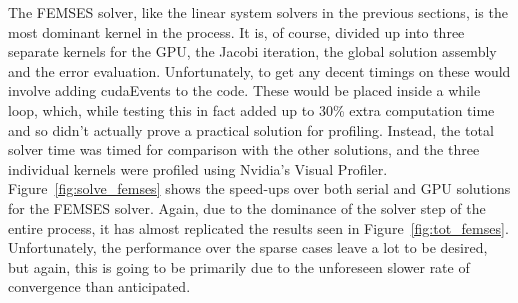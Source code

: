 The FEMSES solver, like the linear system solvers in the previous sections, is the most dominant kernel in the process. It is, of course, divided up into three separate kernels for the GPU, the Jacobi iteration, the global solution assembly and the error evaluation. Unfortunately, to get any decent timings on these would involve adding cudaEvents to the code. These would be placed inside a while loop, which, while testing this in fact added up to 30\% extra computation time and so didn't actually prove a practical solution for profiling. Instead, the total solver time was timed for comparison with the other solutions, and the three individual kernels were profiled using Nvidia's Visual Profiler. Figure~\ref{fig:solve_femses} shows the speed-ups over both serial and GPU solutions for the FEMSES solver. Again, due to the dominance of the solver step of the entire process, it has almost replicated the results seen in Figure~\ref{fig:tot_femses}. Unfortunately, the performance over the sparse cases leave a lot to be desired, but again, this is going to be primarily due to the unforeseen slower rate of convergence than anticipated.

